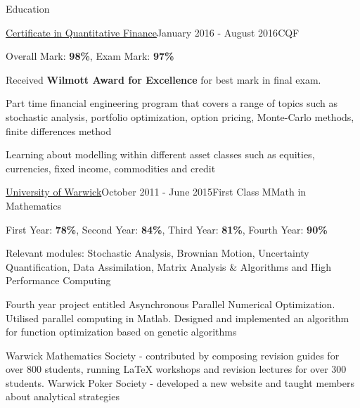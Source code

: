 \documentclass{resume} %
\begin{document}
\begin{rSection}{Education}
	\begin{rSubsection}{\href{https://www.cqf.com/}{Certificate in Quantitative Finance}}{January 2016 - August 2016}{CQF}{}
		\item Overall Mark: {\bf 98\%}, Exam Mark: {\bf 97\%}
		\item Received {\bf Wilmott Award for Excellence} for best mark in final exam.
		\item Part time financial engineering program that covers a range of topics such as stochastic analysis, portfolio optimization, option pricing, Monte-Carlo methods, finite differences method
		\item Learning about modelling within different asset classes such as equities, currencies, fixed income, commodities and credit
	\end{rSubsection}
	\begin{rSubsection}{\href{https://warwick.ac.uk/fac/sci/maths/}{University of Warwick}}{October 2011 - June 2015}{First Class MMath in Mathematics}{}
		\item First Year: {\bf 78\%},  %
		Second Year: {\bf 84\%},  %
		Third Year: {\bf 81\%}, %
		Fourth Year: {\bf 90\%} %
		
		\item  Relevant modules: Stochastic Analysis, Brownian Motion, Uncertainty Quantification, Data Assimilation, Matrix Analysis \& Algorithms and High Performance Computing
		\item Fourth year project entitled Asynchronous Parallel Numerical Optimization. Utilised parallel computing in Matlab. Designed and implemented an algorithm for function optimization based on genetic algorithms
		\item Warwick Mathematics Society - contributed by composing revision guides for over 800 students, running LaTeX workshops and revision lectures for over 300 students. Warwick Poker Society - developed a new website and taught members about analytical strategies
	\end{rSubsection}
	\iffalse
	\begin{rSubsection}{The Latymer School}{ September 2004 - June 2011}{Secondary School}{}
		\item A-Levels: Mathematics ({\bf A*}), Further Mathematics ({\bf A*}), Physics ({\bf A}) 
		\item AS-Levels: Economics ({\bf A}), Additional Further Mathematics ({\bf A}) 
		\item GCSEs: 4 {\bf A*s}, 4 {\bf As} and 1 {\bf B}
	\end{rSubsection}
	\fi
\end{rSection}
\end{document}
